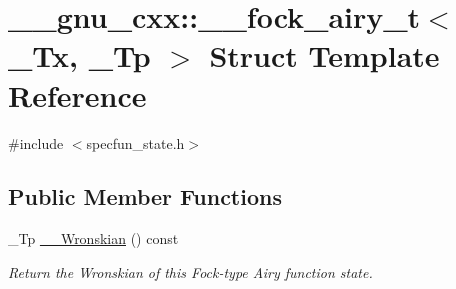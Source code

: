 \hypertarget{struct____gnu__cxx_1_1____fock__airy__t}{}\section{\+\_\+\+\_\+gnu\+\_\+cxx\+:\+:\+\_\+\+\_\+fock\+\_\+airy\+\_\+t$<$ \+\_\+\+Tx, \+\_\+\+Tp $>$ Struct Template Reference}
\label{struct____gnu__cxx_1_1____fock__airy__t}


{\ttfamily \#include $<$specfun\+\_\+state.\+h$>$}

\subsection*{Public Member Functions}
\begin{DoxyCompactItemize}
\item 
\+\_\+\+Tp \hyperlink{struct____gnu__cxx_1_1____fock__airy__t_a08e832f51033aebaba5d30d496783d95}{\+\_\+\+\_\+\+Wronskian} () const
\begin{DoxyCompactList}\small\item\em Return the Wronskian of this Fock-\/type Airy function state. \end{DoxyCompactList}\end{DoxyCompactItemize}

